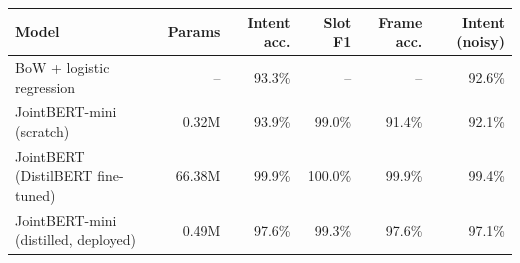 \begin{tabular}{lrrrrr}
\toprule
Model & Params & Intent acc. & Slot F1 & Frame acc. & Intent (noisy) \\
\midrule
BoW + logistic regression & -- & 93.3\% & -- & -- & 92.6\% \\
JointBERT-mini (scratch) & 0.32M & 93.9\% & 99.0\% & 91.4\% & 92.1\% \\
JointBERT (DistilBERT fine-tuned) & 66.38M & 99.9\% & 100.0\% & 99.9\% & 99.4\% \\
JointBERT-mini (distilled, deployed) & 0.49M & 97.6\% & 99.3\% & 97.6\% & 97.1\% \\
\bottomrule
\end{tabular}
